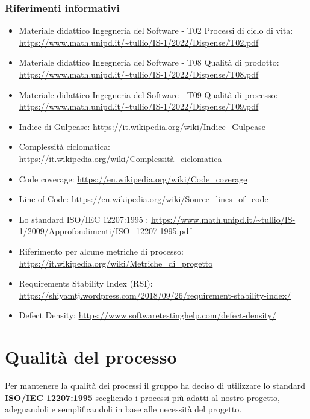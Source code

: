 \subsubsection{Riferimenti informativi}
\begin{itemize}
	\item Materiale didattico Ingegneria del Software - T02 Processi di ciclo di vita: \url{https://www.math.unipd.it/~tullio/IS-1/2022/Dispense/T02.pdf}
	\item Materiale didattico Ingegneria del Software - T08 Qualità di prodotto: \url{https://www.math.unipd.it/~tullio/IS-1/2022/Dispense/T08.pdf}
	\item Materiale didattico Ingegneria del Software - T09 Qualità di processo: \url{https://www.math.unipd.it/~tullio/IS-1/2022/Dispense/T09.pdf}
	\item Indice di Gulpease: \url{https://it.wikipedia.org/wiki/Indice_Gulpease}
	\item Complessità ciclomatica: \url{https://it.wikipedia.org/wiki/Complessità_ciclomatica}
	\item Code coverage: \url{https://en.wikipedia.org/wiki/Code_coverage}
	\item Line of Code: \url{https://en.wikipedia.org/wiki/Source_lines_of_code}	
	\item Lo standard ISO/IEC 12207:1995 : \url{https://www.math.unipd.it/~tullio/IS-1/2009/Approfondimenti/ISO_12207-1995.pdf}
	\item Riferimento per alcune metriche di processo: \url{https://it.wikipedia.org/wiki/Metriche_di_progetto}
	\item Requirements Stability Index (RSI): \url{https://shiyamtj.wordpress.com/2018/09/26/requirement-stability-index/}
	\item Defect Density: \url{https://www.softwaretestinghelp.com/defect-density/}
\end{itemize}

\section{Qualità del processo}
Per mantenere la qualità dei processi il gruppo ha deciso di utilizzare lo standard \textbf{ISO/IEC 12207:1995} scegliendo i processi più adatti al nostro progetto, adeguandoli e semplificandoli in base alle necessità del progetto.

